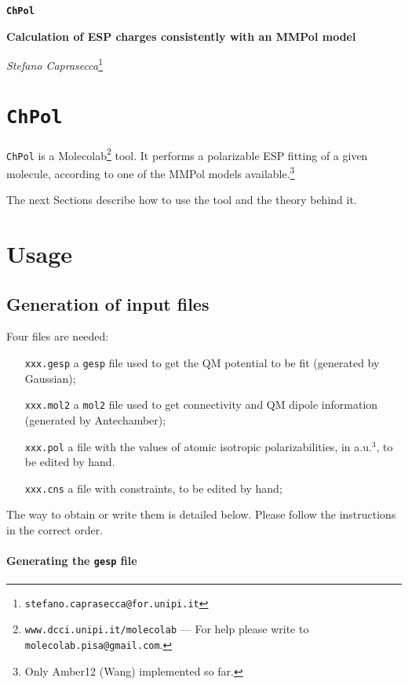\documentclass[a4paper]{report}
\begin{document}
\Large
\begin{center}
\textbf{\texttt{ChPol}}
\end{center}
\textbf{Calculation of ESP charges consistently with an MMPol model}
\normalsize
\begin{center}
\emph{Stefano Caprasecca}\footnote{\texttt{stefano.caprasecca@for.unipi.it}}
\end{center}

\section*{\texttt{ChPol}}

\texttt{ChPol} is a Molecolab\footnote{\texttt{www.dcci.unipi.it/molecolab} ---
For help please write to \texttt{molecolab.pisa@gmail.com}.} tool. It performs a
polarizable ESP fitting of a given molecule, according to one of the MMPol models
available.\footnote{Only Amber12 (Wang) implemented so far.}

The next Sections describe how to use the tool and the theory behind it.

\section*{Usage}

\subsection*{Generation of input files}

Four files are needed:
\begin{itemize}
\item[\texttt{xxx.gesp}] a \texttt{gesp} file used to get the QM potential to be fit
(generated by Gaussian);
\item[\texttt{xxx.mol2}] a \texttt{mol2} file used to get connectivity and QM dipole
information (generated by Antechamber);
\item[\texttt{xxx.pol}] a file with the values of atomic isotropic polarizabilities,
in a.u.$^3$, to be edited by hand.
\item[\texttt{xxx.cns}] a file with constraints, to be edited by hand;
\end{itemize}

The way to obtain or write them is detailed below. Please follow the instructions in
the correct order.

\paragraph*{Generating the \texttt{gesp} file}
\end{document}
